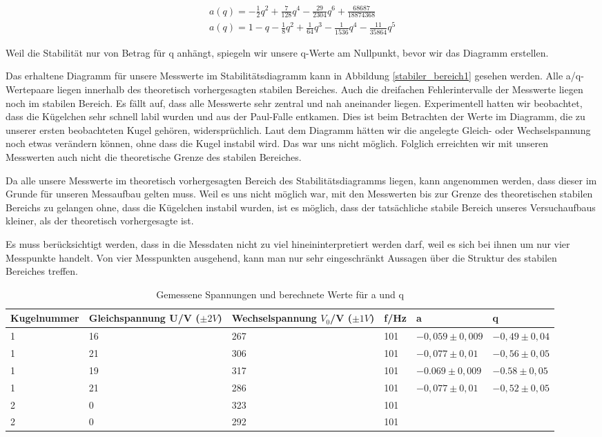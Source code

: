 \documentclass[10pt,a4paper]{article}
\begin{document}
\begin{align}
	a(q) = - \frac{1}{2} q^2 + \frac{7}{128} q^4 - \frac{29}{2304} q^6 + \frac{68687}{18874368}\\
	a(q) = 1-q-\frac{1}{8} q^2 + \frac{1}{64} q^3 - \frac{1}{1536} q^4 - \frac{11}{35864} q^5	
\end{align}

Weil die Stabilität nur von Betrag für q anhängt, spiegeln wir unsere q-Werte am Nullpunkt, bevor wir das Diagramm erstellen. 

Das erhaltene Diagramm für unsere Messwerte im Stabilitätsdiagramm kann in Abbildung \ref{stabiler_bereich1} gesehen werden. Alle a/q-Wertepaare liegen innerhalb des theoretisch vorhergesagten stabilen Bereiches. Auch die dreifachen Fehlerintervalle der Messwerte liegen noch im stabilen Bereich. Es fällt auf, dass alle Messwerte sehr zentral und nah aneinander liegen. Experimentell hatten wir beobachtet, dass die Kügelchen sehr schnell labil wurden und aus der Paul-Falle entkamen. Dies ist beim Betrachten der Werte im Diagramm, die zu unserer ersten beobachteten Kugel gehören, widersprüchlich. Laut dem Diagramm hätten wir die angelegte Gleich- oder Wechselspannung noch etwas verändern können, ohne dass die Kugel instabil wird. Das war uns nicht möglich. Folglich erreichten wir mit unseren Messwerten auch nicht die theoretische Grenze des stabilen Bereiches.

Da alle unsere Messwerte im theoretisch vorhergesagten Bereich des Stabilitätsdiagramms liegen, kann angenommen werden, dass dieser im Grunde für unseren Messaufbau gelten muss. Weil es uns nicht möglich war, mit den Messwerten bis zur Grenze des theoretischen stabilen Bereichs zu gelangen ohne, dass die Kügelchen instabil wurden, ist es möglich, dass der tatsächliche stabile Bereich unseres Versuchaufbaus kleiner, als der theoretisch vorhergesagte ist. 

Es muss berücksichtigt werden, dass in die Messdaten nicht zu viel hineininterpretiert werden darf, weil es sich bei ihnen um nur vier Messpunkte handelt. Von vier Messpunkten ausgehend, kann man nur sehr eingeschränkt Aussagen über die Struktur des stabilen Bereiches treffen. 

\begin{table}[h!]
	\centering
	\begin{tabular}{|l|l|l|l|l|l|}\hline
		Kugelnummer & Gleichspannung U/V ($\pm 2V$) & Wechselspannung $V_0$/V ($\pm 1V$)& f/Hz & a & q\\\hline
		1 & 16 & 267 & 101 & $-0,059 \pm 0,009$ & $-0,49 \pm 0,04$\\
		1 & 21 & 306 & 101 & $-0,077 \pm 0,01$ & $-0,56 \pm 0,05$\\
		1 & 19 & 317 & 101 & $-0.069 \pm 0,009$ & $-0.58 \pm 0,05$\\
		1 & 21 & 286 & 101 & $-0,077 \pm 0,01$ & $-0,52 \pm 0,05$\\
		2 & 0 & 323 & 101 &&\\
		2 & 0 & 292 & 101 &&\\\hline
	\end{tabular}
	\caption{Gemessene Spannungen und berechnete Werte für a und q}
	\label{gefangen2}
\end{table}
\end{document}
